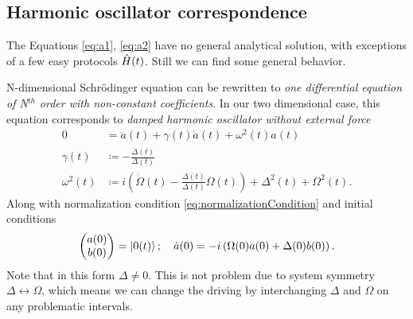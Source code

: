 \subsection{Harmonic oscillator correspondence}
The Equations \ref{eq:a1}, \ref{eq:a2} have no general analytical solution, with exceptions of a few easy protocols $\hat{H}(t)$. Still we can find some general behavior. 

N-dimensional Schr\"odinger equation can be rewritten to \emph{one differential equation of N$^{th}$ order with non-constant coefficients}. In our two dimensional case, this equation corresponds to \emph{damped harmonic oscillator without external force}
\begin{align}
    0&= \ddot a(t)+ \gamma(t) \dot a(t)+\omega^2(t)a(t) \label{eq:harmonicOscillator}\\
    \gamma(t)&\coloneqq -\frac{\dot \Delta(t)}{\Delta(t)} \label{eq:gammaDef}\\
    \omega^2(t) &\coloneqq i\left(\dot \Omega(t)-\frac{\dot\Delta(t)}{\Delta(t)}\Omega(t)\right)+\Delta^2(t)+\Omega^2(t).
    \label{eq:frequency}
\end{align}
Along with normalization condition \ref{eq:normalizationCondition} and initial conditions
\begin{equation}
    \begin{pmatrix}
        a(0)\\b(0)
    \end{pmatrix}=\ket{0(t)}; \quad \dot a(0)=-i\left(\Omega(0) a(0)+\Delta(0)b(0)\right).
\end{equation}
Note that in this form $\Delta\neq 0$. This is not problem due to system symmetry $\Delta\leftrightarrow \Omega$, which means we can change the driving by interchanging $\Delta$ and $\Omega$ on any problematic intervals.


